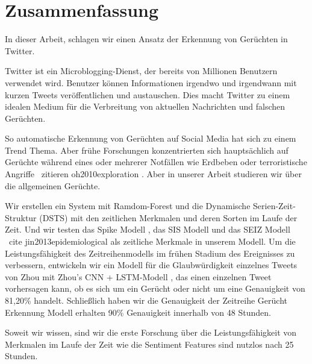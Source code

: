 \chapter*{Zusammenfassung}
In dieser Arbeit, schlagen wir einen Ansatz der Erkennung von Ger\"uchten in Twitter.

Twitter ist ein Microblogging-Dienst, der bereits von Millionen Benutzern verwendet wird. Benutzer k\"onnen Informationen irgendwo und irgendwann mit kurzen Tweets ver\"offentlichen und austauschen. Dies macht Twitter zu einem idealen Medium f\"ur die Verbreitung von aktuellen Nachrichten und falschen Ger\"uchten.

So automatische Erkennung von Ger\"uchten auf Social Media hat sich zu einem Trend Thema. Aber fr\"uhe Forschungen konzentrierten sich haupts\"achlich auf Ger\"uchte w\"ahrend eines oder mehrerer Notf\"allen wie Erdbeben oder terroristische Angriffe \ zitieren {oh2010exploration} \cite {tanaka2012transmission} \cite {starbird2014rumors}. Aber in unserer Arbeit studieren wir \"uber die allgemeinen Ger\"uchte.

Wir erstellen ein System mit Ramdom-Forest und die Dynamische Serien-Zeit-Struktur (DSTS) \cite {ma2015detect} mit den zeitlichen Merkmalen und deren Sorten im Laufe der Zeit. Und wir testen das Spike Modell \cite {kwon2013prominent}, das SIS Modell und das SEIZ Modell \ cite {jin2013epidemiological} als zeitliche Merkmale in unserem Modell. Um die Leistungsf\"ahigkeit des Zeitreihenmodells im frühen Stadium des Ereignisses zu verbessern, entwickeln wir ein Modell f\"ur die Glaubw\"urdigkeit einzelnes Tweets von Zhou mit Zhou's CNN + LSTM-Modell \cite {zhou2015c}, das einen einzelnen Tweet vorhersagen kann, ob es sich um ein Ger\"ucht oder nicht um eine Genauigkeit von 81,20\% handelt. Schlie\ss lich haben wir die Genauigkeit der Zeitreihe Ger\"ucht Erkennung Modell erhalten 90\% Genauigkeit innerhalb von 48 Stunden.  

Soweit wir wissen, sind wir die erste Forschung \"uber die Leistungsf\"ahigkeit von Merkmalen im Laufe der Zeit wie die Sentiment Features sind nutzlos nach 25 Stunden.
